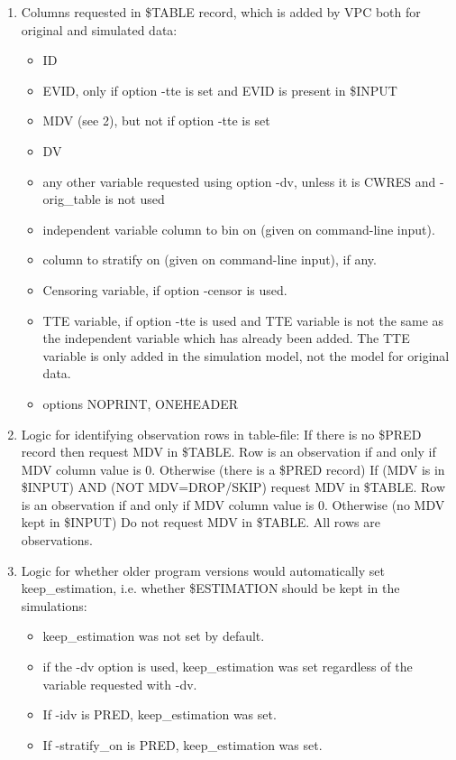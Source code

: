 \begin{enumerate}
	\item Columns requested in \$TABLE record, which is added by VPC both for original and simulated data:
	\begin{itemize}
		\item ID
		\item EVID, only if option -tte is set and EVID is present in \$INPUT
		\item MDV (see 2), but not if option -tte is set
		\item DV
		\item any other variable requested using option -dv, unless it is CWRES and -orig\_table is not used
		\item independent variable column to bin on (given on command-line input).
		\item column to stratify on (given on command-line input), if any.
		\item Censoring variable, if option -censor is used.
		\item TTE variable, if option -tte is used and TTE variable is not the same as the independent variable which has already been added. The TTE variable is only added in the simulation model, not the model for original data.
		\item options NOPRINT, ONEHEADER
	\end{itemize}
	\item Logic for identifying observation rows  in table-file:
If there is no \$PRED record
	then request MDV in \$TABLE. Row is an observation if and only if MDV column value is 0.
Otherwise (there is a \$PRED record)
	If (MDV is in \$INPUT) AND (NOT MDV=DROP/SKIP)
		request MDV in \$TABLE. Row is an observation if and only if MDV column value is 0.
	Otherwise (no MDV kept in \$INPUT)
		Do not request MDV in \$TABLE. All rows are observations.
	\item Logic for whether older program versions would automatically set keep\_estimation, i.e. whether \$ESTIMATION should be kept in the simulations:
	\begin{itemize}
		\item keep\_estimation was not set by default.
		\item if the -dv option is used, keep\_estimation was set regardless of the variable requested with -dv.
		\item If -idv is PRED, keep\_estimation was set.
		\item If -stratify\_on is PRED, keep\_estimation was set.
	\end{itemize}
\end{enumerate}

